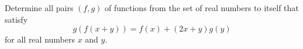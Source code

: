Determine all pairs 
$(f,g)$
 of functions from the set of real numbers to itself that satisfy 
\[g(f(x+y)) = f(x) + (2x + y)g(y)\]
 for all real numbers 
$x$
 and 
$y$.
